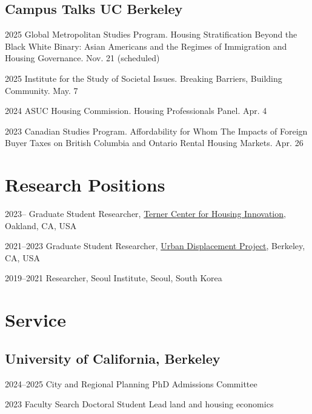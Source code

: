 \documentclass[11pt,letterpaper]{article}
\newcommand{\term}[1]{(#1)}     %
\begin{document}
\subsection{Campus Talks UC Berkeley}
\begin{tablist}
  \item[2025] \tab{}Global Metropolitan Studies Program. Housing Stratification Beyond the Black White Binary: Asian Americans and the Regimes of Immigration and Housing Governance. Nov. 21 \term{scheduled}
  \item[2025] \tab{}Institute for the Study of Societal Issues. Breaking Barriers, Building Community. May. 7
  \item[2024] \tab{}ASUC Housing Commission. Housing Professionals Panel. Apr. 4
  \item[2023] \tab{}Canadian Studies Program. Affordability for Whom The Impacts of Foreign Buyer Taxes on British Columbia and Ontario Rental Housing Markets. Apr. 26
\end{tablist}

\section{Research Positions}
\begin{tablist}
  \item[2023– ] \tab{}Graduate Student Researcher, \href{https://ternercenter.berkeley.edu/}{Terner Center for Housing Innovation}, Oakland, CA, USA
  \item[2021–2023] \tab{}Graduate Student Researcher, \href{https://www.urbandisplacement.org/}{Urban Displacement Project}, Berkeley, CA, USA
  \item[2019–2021] \tab{}Researcher, Seoul Institute, Seoul, South Korea
\end{tablist}

\section{Service}

\subsection{University of California, Berkeley}
\begin{tablist}
  \item[2024–2025] \tab{}City and Regional Planning PhD Admissions Committee
  \item[2023] \tab{}Faculty Search Doctoral Student Lead land and housing economics
\end{tablist}
\end{document}
